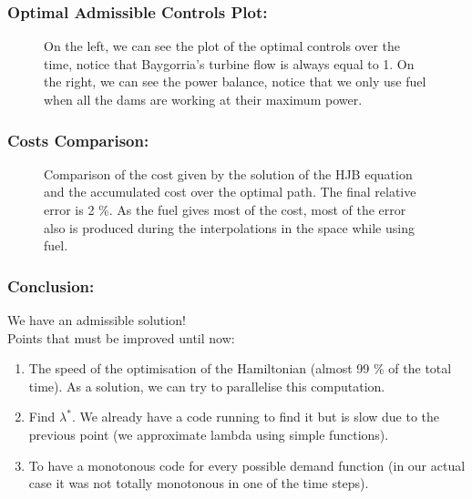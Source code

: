 \documentclass[aspectratio=169]{beamer}\usepackage[utf8]{inputenc}
\begin{document}
\begin{frame}\frametitle{Optimal Admissible Controls Plot:}
\begin{figure}[ht!]
\centering
{}
\caption{On the left, we can see the plot of the optimal controls over the time, notice that Baygorria's turbine flow is always equal to 1. On the right, we can see the power balance, notice that we only use fuel when all the dams are working at their maximum power.}
\end{figure}
\end{frame}

\begin{frame}\frametitle{Costs Comparison:}
\begin{figure}[ht!]
\centering
{}
\caption{Comparison of the cost given by the solution of the HJB equation and the accumulated cost over the optimal path. The final relative error is 2 \%. As the fuel gives most of the cost, most of the error also is produced during the interpolations in the space while using fuel.}
\end{figure}
\end{frame}

\begin{frame}\frametitle{Conclusion:}
We have an admissible solution!\\
Points that must be improved until now:
\begin{enumerate}
\item The speed of the optimisation of the Hamiltonian (almost 99 \% of the total time). As a solution, we can try to parallelise this computation.\\
\item Find $\lambda^*$. We already have a code running to find it but is slow due to the previous point (we approximate lambda using simple functions).
\item To have a monotonous code for every possible demand function (in our actual case it was not totally monotonous in one of the time steps).
\end{enumerate}
\end{frame}
\end{document}
